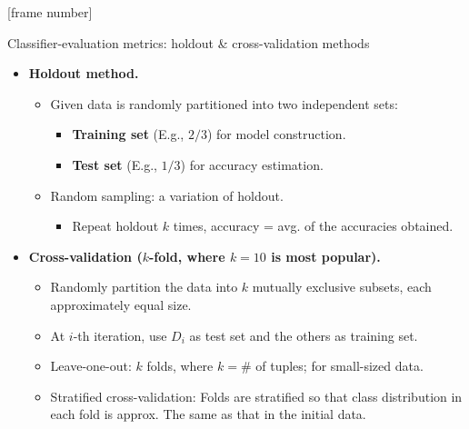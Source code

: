 \documentclass[aspectratio=169,t,table]{beamer}
\begin{document}
  {
    [frame number]
    \begin{frame}{Classifier-evaluation metrics: holdout \& cross-validation methods}
      \begin{itemize}
        \item \textbf{Holdout method.}
        \begin{itemize}
          \item Given data is randomly partitioned into two independent sets:
          \begin{itemize}
            \item \textbf{\color{airforceblue}Training set} (E.g., $2/3$) for model construction.
            \item \textbf{\color{airforceblue}Test set} (E.g., $1/3$) for accuracy estimation.
          \end{itemize}
          \item Random sampling: a variation of holdout.
          \begin{itemize}
            \item Repeat holdout $k$ times, accuracy = avg. of the accuracies obtained.
          \end{itemize}
        \end{itemize}
        \item \textbf{{\color{airforceblue}Cross-validation} ($k$-fold, where $k = 10$ is most popular).}
        \begin{itemize}
          \item Randomly partition the data into $k$ mutually exclusive subsets, each approximately equal size.
          \item At $i$-th iteration, use $D_i$ as test set and the others as training set.
          \item Leave-one-out: $k$ folds, where $k = \#$ of tuples; for small-sized data.
          \item Stratified cross-validation: Folds are stratified so that class distribution in each fold is approx. The same as that in the initial data.
        \end{itemize}
      \end{itemize}
    \end{frame}
  }
\end{document}
